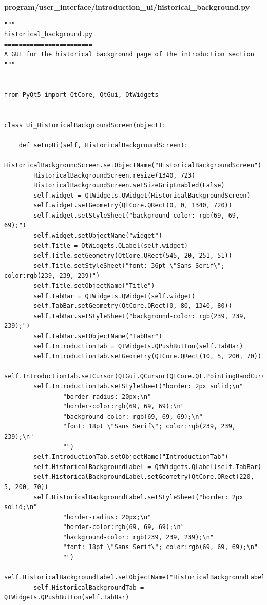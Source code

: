 \documentclass{article}
\begin{document}
\textbf{program/user\_interface/introduction\_ui/historical\_background.py}
\begin{lstlisting}
"""
historical_background.py
========================
A GUI for the historical background page of the introduction section
"""


from PyQt5 import QtCore, QtGui, QtWidgets


class Ui_HistoricalBackgroundScreen(object):

    def setupUi(self, HistoricalBackgroundScreen):
        HistoricalBackgroundScreen.setObjectName("HistoricalBackgroundScreen")
        HistoricalBackgroundScreen.resize(1340, 723)
        HistoricalBackgroundScreen.setSizeGripEnabled(False)
        self.widget = QtWidgets.QWidget(HistoricalBackgroundScreen)
        self.widget.setGeometry(QtCore.QRect(0, 0, 1340, 720))
        self.widget.setStyleSheet("background-color: rgb(69, 69, 69);")
        self.widget.setObjectName("widget")
        self.Title = QtWidgets.QLabel(self.widget)
        self.Title.setGeometry(QtCore.QRect(545, 20, 251, 51))
        self.Title.setStyleSheet("font: 36pt \"Sans Serif\"; color:rgb(239, 239, 239)")
        self.Title.setObjectName("Title")
        self.TabBar = QtWidgets.QWidget(self.widget)
        self.TabBar.setGeometry(QtCore.QRect(0, 80, 1340, 80))
        self.TabBar.setStyleSheet("background-color: rgb(239, 239, 239);")
        self.TabBar.setObjectName("TabBar")
        self.IntroductionTab = QtWidgets.QPushButton(self.TabBar)
        self.IntroductionTab.setGeometry(QtCore.QRect(10, 5, 200, 70))
        self.IntroductionTab.setCursor(QtGui.QCursor(QtCore.Qt.PointingHandCursor))
        self.IntroductionTab.setStyleSheet("border: 2px solid;\n"
                "border-radius: 20px;\n"
                "border-color:rgb(69, 69, 69);\n"
                "background-color: rgb(69, 69, 69);\n"
                "font: 18pt \"Sans Serif\"; color:rgb(239, 239, 239);\n"
                "")
        self.IntroductionTab.setObjectName("IntroductionTab")
        self.HistoricalBackgroundLabel = QtWidgets.QLabel(self.TabBar)
        self.HistoricalBackgroundLabel.setGeometry(QtCore.QRect(220, 5, 200, 70))
        self.HistoricalBackgroundLabel.setStyleSheet("border: 2px solid;\n"
                "border-radius: 20px;\n"
                "border-color:rgb(69, 69, 69);\n"
                "background-color: rgb(239, 239, 239);\n"
                "font: 18pt \"Sans Serif\"; color:rgb(69, 69, 69);\n"
                "")
        self.HistoricalBackgroundLabel.setObjectName("HistoricalBackgroundLabel")
        self.HistoricalBackgroundTab = QtWidgets.QPushButton(self.TabBar)

\end{lstlisting}
\end{document}
